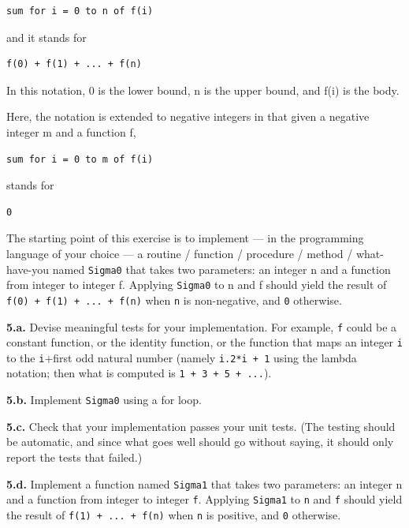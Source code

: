 \documentclass[12pt]{article}
\begin{document}
\begin{verbatim}
sum for i = 0 to n of f(i)
\end{verbatim}

and it stands for

\begin{verbatim}
f(0) + f(1) + ... + f(n)
\end{verbatim}

In this notation, 0 is the lower bound, n is the upper bound, and f(i) is the
body.

Here, the notation is extended to negative integers in that given a negative
integer m and a function f,

\begin{verbatim}
sum for i = 0 to m of f(i)
\end{verbatim}

stands for

\begin{verbatim}
0
\end{verbatim}

The starting point of this exercise is to implement --- in the programming
language of your choice --- a routine / function / procedure / method /
what-have-you named \texttt{Sigma0} that takes two parameters: an integer n and
a function from integer to integer f. Applying \texttt{Sigma0} to n and f should
yield the result of \texttt{f(0) + f(1) + ... + f(n)} when \texttt{n} is
non-negative, and \texttt{0} otherwise.

\textbf{5.a.} Devise meaningful tests for your implementation. For example,
\texttt{f} could be a constant function, or the identity function, or the
function that maps an integer \texttt{i} to the \texttt{i}+first odd natural
number (namely \texttt{i.2*i + 1} using the lambda notation; then what is
computed is \texttt{1 + 3 + 5 + ...}).

\textbf{5.b.} Implement \texttt{Sigma0} using a for loop.

\textbf{5.c.} Check that your implementation passes your unit tests. (The testing
should be automatic, and since what goes well should go without saying, it
should only report the tests that failed.)

\textbf{5.d.} Implement a function named \texttt{Sigma1} that takes two
parameters: an integer n and a function from integer to integer \texttt{f}.
Applying \texttt{Sigma1} to \texttt{n} and \texttt{f} should yield the result of
\texttt{f(1) + ... + f(n)} when \texttt{n} is positive, and \texttt{0} otherwise.
\end{document}

